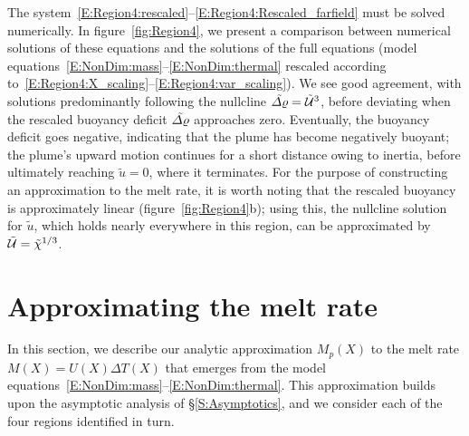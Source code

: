 \documentclass[openacc]{rsproca_new}%
\begin{document}
The system~\eqref{E:Region4:rescaled}--\eqref{E:Region4:Rescaled_farfield} must be solved numerically. In figure~\ref{fig:Region4}, we present a comparison between numerical solutions of these equations and the solutions of the full equations (model equations~\eqref{E:NonDim:mass}--\eqref{E:NonDim:thermal} rescaled according to~\eqref{E:Region4:X_scaling}--\eqref{E:Region4:var_scaling}). We see good agreement, with solutions predominantly following the nullcline $\tilde{\varDelta \varrho} = \tilde{\mathcal{U}}^3$, before deviating when the rescaled buoyancy deficit $\tilde{\varDelta \varrho}$ approaches zero. Eventually, the buoyancy deficit goes negative, indicating that the plume has become negatively buoyant; the plume's upward motion continues for a short distance owing to inertia, before ultimately reaching $\tilde{u} = 0$, where it terminates. For the purpose of constructing an approximation to the melt rate, it is worth noting that the rescaled buoyancy is approximately linear (figure~\ref{fig:Region4}b); using this, the nullcline solution for $\tilde{u}$, which holds nearly everywhere in this region, can be approximated by $\tilde{\mathcal{U}} = \tilde{\chi}^{1/3}$.

\section{Approximating the melt rate}\label{S:MeltRate}
In this section, we describe our analytic approximation $M_p(X)$ to the melt rate $M(X) = U(X)\Delta T(X)$ that emerges from the model equations~\eqref{E:NonDim:mass}--\eqref{E:NonDim:thermal}. This approximation builds upon the asymptotic analysis of \S\ref{S:Asymptotics}, and we consider each of the four regions identified in turn.
\end{document}
